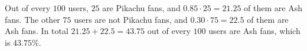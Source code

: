 Out of every $100$ users, $25$ are Pikachu fans, and $0.85\cdot25=21.25$ of them are Ash fans. The other $75$ users are not Pikachu fans, and $0.30\cdot75=22.5$ of them are Ash fans. In total $21.25+22.5=43.75$ out of every $100$ users are Ash fans, which is $\boxed{43.75\%}$.
